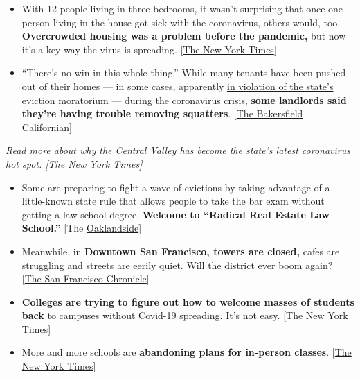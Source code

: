 \begin{itemize}
\item
  With 12 people living in three bedrooms, it wasn't surprising that
  once one person living in the house got sick with the coronavirus,
  others would, too. \textbf{Overcrowded housing was a problem before
  the pandemic,} but now it's a key way the virus is spreading.
  {[}\href{https://www.nytimes.com/2020/08/01/business/economy/housing-overcrowding-coronavirus.html?}{The
  New York Times}{]}
\item
  ``There's no win in this whole thing.'' While many tenants have been
  pushed out of their homes --- in some cases, apparently
  \href{https://calmatters.org/housing/2020/07/imperial-county-evictions-rules/}{in
  violation of the state's eviction moratorium} --- during the
  coronavirus crisis, \textbf{some landlords said they're having trouble
  removing squatters}.
  {[}\href{https://www.bakersfield.com/news/squatters-sit-out-evictions-moratorium/article_56f30548-d2d6-11ea-bccd-47329a9189c1.html}{The
  Bakersfield Californian}{]}
\end{itemize}

\emph{Read more about why the Central Valley has become the state's
latest coronavirus hot spot.
{[}}\href{https://www.nytimes.com/2020/07/28/us/newsom-coronavirus-valley.html}{\emph{The
New York Times}}\emph{{]}}

\begin{itemize}
\item
  Some are preparing to fight a wave of evictions by taking advantage of
  a little-known state rule that allows people to take the bar exam
  without getting a law school degree. \textbf{Welcome to ``Radical Real
  Estate Law School.''} {[}The
  \href{https://oaklandside.org/2020/07/30/oakland-radical-real-estate-law-school/}{Oaklandside}{]}
\item
  Meanwhile, in \textbf{Downtown San Francisco, towers are closed,}
  cafes are struggling and streets are eerily quiet. Will the district
  ever boom again?
  {[}\href{https://www.sfchronicle.com/business/article/Downtown-San-Francisco-coronavirus-pandemic-15450388.php}{The
  San Francisco Chronicle}{]}
\item
  \textbf{Colleges are trying to figure out how to welcome masses of
  students back} to campuses without Covid-19 spreading. It's not easy.
  {[}\href{https://www.nytimes.com/2020/08/02/us/covid-college-reopening.html?}{The
  New York Times}{]}
\item
  More and more schools are \textbf{abandoning plans for in-person
  classes}.
  {[}\href{https://www.nytimes.com/2020/08/01/us/schools-reopening-indiana-coronavirus.html?smtyp=cur\&smid=tw-nytimes}{The
  New York Times}{]}
\end{itemize}

